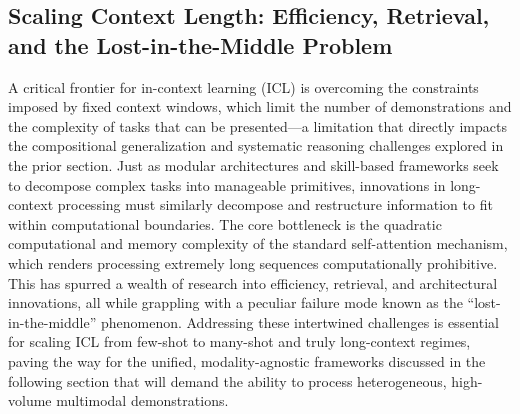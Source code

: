 \documentclass[11pt]{article}
\begin{document}
\subsection{Scaling Context Length: Efficiency, Retrieval, and the Lost-in-the-Middle Problem}

A critical frontier for in-context learning (ICL) is overcoming the constraints imposed by fixed context windows, which limit the number of demonstrations and the complexity of tasks that can be presented---a limitation that directly impacts the compositional generalization and systematic reasoning challenges explored in the prior section. Just as modular architectures and skill-based frameworks seek to decompose complex tasks into manageable primitives, innovations in long-context processing must similarly decompose and restructure information to fit within computational boundaries. The core bottleneck is the quadratic computational and memory complexity of the standard self-attention mechanism, which renders processing extremely long sequences computationally prohibitive. This has spurred a wealth of research into efficiency, retrieval, and architectural innovations, all while grappling with a peculiar failure mode known as the ``lost-in-the-middle'' phenomenon. Addressing these intertwined challenges is essential for scaling ICL from few-shot to many-shot and truly long-context regimes, paving the way for the unified, modality-agnostic frameworks discussed in the following section that will demand the ability to process heterogeneous, high-volume multimodal demonstrations.
\end{document}
